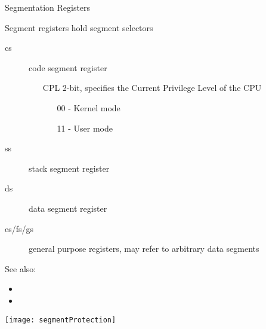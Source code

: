 \begin{frame}{Segmentation Registers}
  \begin{block}{Segment registers hold segment selectors}
    \begin{description}
    \item[cs] code segment register
      \begin{itemize}
      \item[CPL] 2-bit, specifies the Current Privilege Level of the CPU
        \begin{itemize}
        \item[00] - Kernel mode
        \item[11] - User mode
        \end{itemize}
      \end{itemize}
    \item[ss] stack segment register
    \item[ds] data segment register
    \item[es/fs/gs] general purpose registers, may refer to arbitrary data segments
    \end{description}
  \end{block}
\end{frame}

See also:
\begin{itemize}
\item {}
\item {}
\end{itemize}


\begin{center}
  \texttt{[image: segmentProtection]}
\end{center}

